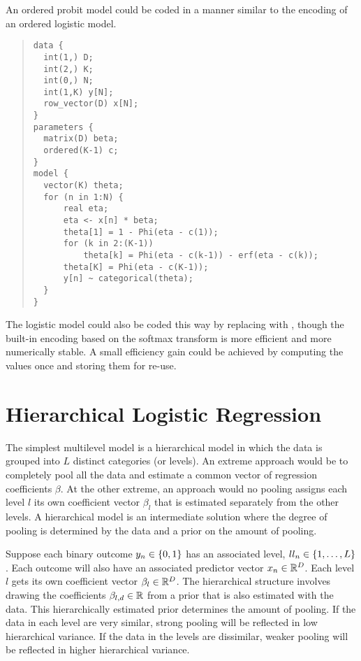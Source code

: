 An ordered probit model could be coded in a manner similar to the
\BUGS encoding of an ordered logistic model.
%
\begin{quote}
\begin{Verbatim}
data {
  int(1,) D;
  int(2,) K;
  int(0,) N;
  int(1,K) y[N];
  row_vector(D) x[N];
}
parameters {
  matrix(D) beta;
  ordered(K-1) c;
}
model {
  vector(K) theta;
  for (n in 1:N) {
      real eta;
      eta <- x[n] * beta;
      theta[1] = 1 - Phi(eta - c(1));
      for (k in 2:(K-1))
          theta[k] = Phi(eta - c(k-1)) - erf(eta - c(k));
      theta[K] = Phi(eta - c(K-1));
      y[n] ~ categorical(theta);
  }
}
\end{Verbatim}
\end{quote}
%
The logistic model could also be coded this way by replacing
 with , though the built-in encoding based
on the softmax transform is more efficient and more numerically
stable.  A small efficiency gain could be achieved by computing the
values  once and storing them for re-use.

\section{Hierarchical Logistic Regression}

The simplest multilevel model is a hierarchical model in which the
data is grouped into $L$ distinct categories (or levels).  An extreme approach would be to
completely pool all the data and estimate a common vector of
regression coefficients $\beta$.  At the other extreme, an approach
would no pooling assigns each level $l$ its own coefficient vector
$\beta_l$ that is estimated separately from the other levels.  A
hierarchical model is an intermediate solution where the degree of
pooling is determined by the data and a prior on the amount of
pooling.

Suppose each binary outcome $y_n \in \{ 0,1 \}$ has an associated
level, $ll_n \in \{ 1,\ldots,L \}$.  Each outcome will also have
an associated predictor vector $x_n \in \mathbb{R}^D$.  Each level $l$
gets its own coefficient vector $\beta_l \in \mathbb{R}^D$.  The
hierarchical structure involves drawing the coefficients $\beta_{l,d}
\in \mathbb{R}$ from a prior that is also estimated with the data.  This
hierarchically estimated prior determines the amount of pooling.  If
the data in each level are very similar, strong pooling will be
reflected in low hierarchical variance.  If the data in the levels are
dissimilar, weaker pooling will be reflected in higher hierarchical variance.

